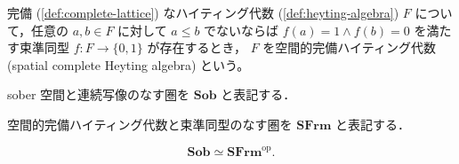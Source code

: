 \documentclass[titlepage]{ltjsreport}
\begin{document}
\begin{definition}[空間的完備ハイティング代数]
  完備
  (\cref{def:complete-lattice})
  なハイティング代数
  (\cref{def:heyting-algebra})
  $F$
  について，任意の
  $a,b\in F$
  に対して
  $a\le b$
  でないならば
  $f(a)=1\wedge f(b)=0$
  を満たす束準同型
  $f:F\to\{0,1\}$
  が存在するとき，
  $F$
  を空間的完備ハイティング代数
  (spatial complete Heyting algebra)
  という。
\end{definition}

\newcommand{\sob}{\mathbf{Sob}}
\newcommand{\sfrm}{\mathbf{SFrm}}

\begin{definition}
  sober 空間と連続写像のなす圏を $\sob$ と表記する．
\end{definition}

\begin{definition}[空間的完備ハイティング代数の圏]
  空間的完備ハイティング代数と束準同型のなす圏を $\sfrm$ と表記する．
\end{definition}

\begin{theorem}[ストーンの双対性定理]
  \begin{equation}
    \sob\simeq\sfrm^\mathrm{op}.
  \end{equation}
\end{theorem}
\end{document}
